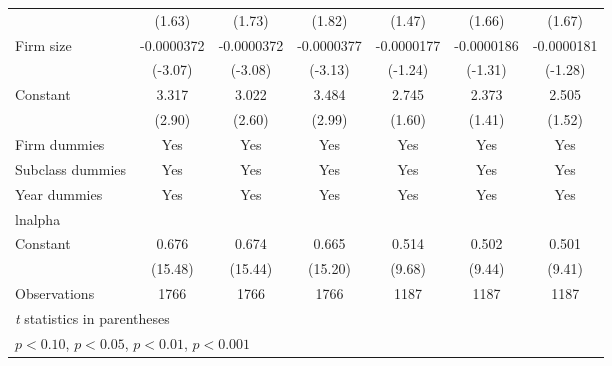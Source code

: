 \begin{sidewaystable}[htbp]
{\begin{tabular}{l*{6}{c}}
                    &      (1.63)         &      (1.73)         &      (1.82)         &      (1.47)         &      (1.66)         &      (1.67)         \\
\addlinespace
Firm size           &  -0.0000372\sym{**} &  -0.0000372\sym{**} &  -0.0000377\sym{**} &  -0.0000177         &  -0.0000186         &  -0.0000181         \\
                    &     (-3.07)         &     (-3.08)         &     (-3.13)         &     (-1.24)         &     (-1.31)         &     (-1.28)         \\
\addlinespace
Constant            &       3.317\sym{**} &       3.022\sym{**} &       3.484\sym{**} &       2.745         &       2.373         &       2.505         \\
                    &      (2.90)         &      (2.60)         &      (2.99)         &      (1.60)         &      (1.41)         &      (1.52)         \\
\addlinespace
Firm dummies&Yes&Yes&Yes&Yes&Yes&Yes\\
\addlinespace
Subclass dummies&Yes&Yes&Yes&Yes&Yes&Yes\\
\addlinespace
Year dummies&Yes&Yes&Yes&Yes&Yes&Yes\\
\midrule
lnalpha             &                     &                     &                     &                     &                     &                     \\
Constant            &       0.676\sym{***}&       0.674\sym{***}&       0.665\sym{***}&       0.514\sym{***}&       0.502\sym{***}&       0.501\sym{***}\\
                    &     (15.48)         &     (15.44)         &     (15.20)         &      (9.68)         &      (9.44)         &      (9.41)         \\
\midrule
Observations        &        1766         &        1766         &        1766         &        1187         &        1187         &        1187         \\
\bottomrule
\multicolumn{7}{l}{\footnotesize \textit{t} statistics in parentheses}\\
\multicolumn{7}{l}{\footnotesize \sym{+} \(p<0.10\), \sym{*} \(p<0.05\), \sym{**} \(p<0.01\), \sym{***} \(p<0.001\)}\\
\end{tabular}
}
\end{sidewaystable}
